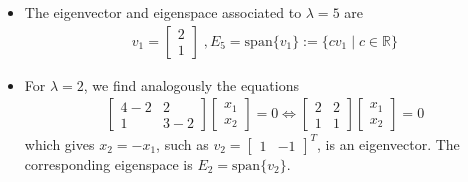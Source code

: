 \begin{frame}{}
\begin{itemize}
    \item The eigenvector and eigenspace associated to $\lambda=5$ are 
    \begin{align*}
         v_1 = \begin{bmatrix} 2\\
         1
    \end{bmatrix} \; , E_5 = \text{span}\{ v_1 \}:= \{ c v_1 \mid c\in \mathbb{R} \}
    \end{align*}
    \item For $\lambda  =  2$, we find analogously the equations
    \begin{align*}
        \begin{bmatrix}
            4-2 & 2 \\
            1 & 3-2 
        \end{bmatrix}\begin{bmatrix}
            x_1\\
            x_2
        \end{bmatrix} = 0 \Longleftrightarrow  \begin{bmatrix}
            2  & 2 \\
            1 & 1 
        \end{bmatrix}\begin{bmatrix}
            x_1\\
            x_2
        \end{bmatrix} = 0
    \end{align*}
    which gives $x_2=-x_1$, such as    $v_2 = \begin{bmatrix}
        1 & -1
    \end{bmatrix}^T$, is an eigenvector. The corresponding eigenspace is  $   E_2 = \text{span} \{ v_2\}$.
\end{itemize}
\end{frame}



